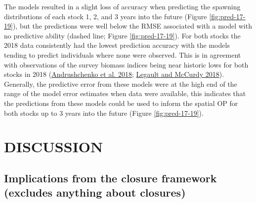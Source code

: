 \documentclass[
]{article}
\begin{document}
The models resulted in a slight loss of accuracy when predicting the spawning distributions of each stock 1, 2, and 3 years into the future (Figure \ref{fig:pred-17-19}), but the predictions were well below the RMSE associated with a model with no predictive ability (dashed line; Figure \ref{fig:pred-17-19}). For both stocks the 2018 data consistently had the lowest prediction accuracy with the models tending to predict individuals where none were observed. This is in agreement with observations of the survey biomass indices being near historic lows for both stocks in 2018 (\protect\hyperlink{ref-andrushchenkoAssessmentEasternGeorges2018}{Andrushchenko et al. 2018}; \protect\hyperlink{ref-legaultStockAssessmentGeorges2018}{Legault and McCurdy 2018}). Generally, the predictive error from these models were at the high end of the range of the model error estimates when data were available, this indicates that the predictions from these models could be used to inform the spatial OP for both stocks up to 3 years into the future (Figure \ref{fig:pred-17-19}).

\hypertarget{discussion}{%
\section{DISCUSSION}\label{discussion}}

\hypertarget{implications-from-the-closure-framework-excludes-anything-about-closures}{%
\subsection{Implications from the closure framework (excludes anything about closures)}\label{implications-from-the-closure-framework-excludes-anything-about-closures}}
\end{document}
